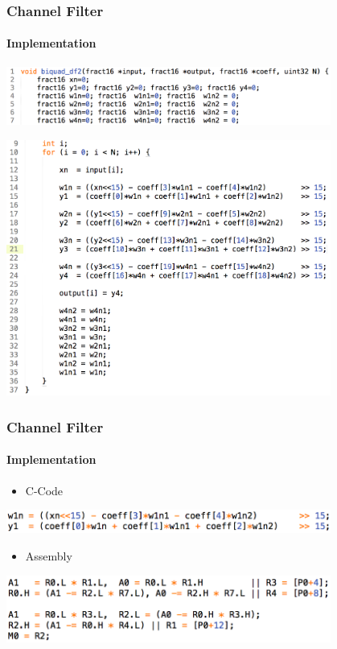 \begin{frame} \frametitle{Channel Filter}
    \framesubtitle{Implementation}
    \begin{center}
        \includegraphics[width=0.8\textwidth]{img/filter_snippet}
    \end{center}
    \begin{center}
        \includegraphics[width=0.8\textwidth]{img/filter_loop}
    \end{center}
\end{frame}

\begin{frame} \frametitle{Channel Filter}
    \framesubtitle{Implementation}
    \begin{itemize}
        \item C-Code
    \end{itemize}
    \begin{center}
        \includegraphics[width=0.8\textwidth]{img/filter_C_cascade}
    \end{center}
    \begin{itemize}
        \item Assembly
    \end{itemize}
    \begin{center}
        \includegraphics[width=0.8\textwidth]{img/filter_asm_cascade}
    \end{center}
\end{frame}

